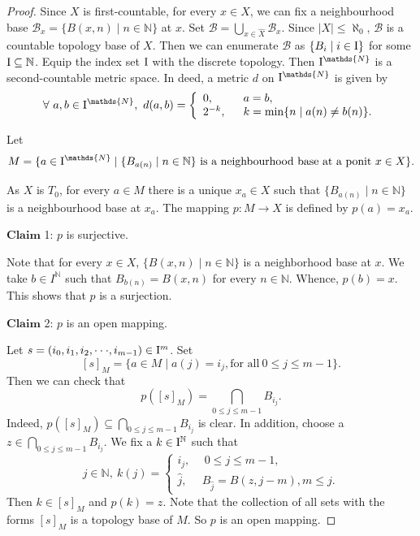 \documentclass[preprint,12pt]{elsarticle}
\numberwithin{equation}{section}
\begin{document}
\begin{proof} Since $X$ is first-countable, for every $x\in X$, we can fix a neighbourhood base $\mathcal{B}_{x}=\{B(x,n)\mid n\in\mathbb{N}\}$ at $x$. Set $\mathcal{B}=\bigcup\limits_{x\in \widehat{X}}\mathcal{B}_{x}$. Since $|X|\leq\aleph_{0}$, $\mathcal{B}$ is a countable topology base of $X$. Then we can enumerate $\mathcal{B}$ as $\{B_{i}\mid i\in {\rm I}\}$ for some ${\rm I}\subseteq\mathbb{N}$. Equip the index set ${\rm I}$ with the discrete topology. Then ${\rm I}^{\mathds{N}}$ is a second-countable metric space. In deed, a metric $d$ on ${\rm I}^{\mathds{N}}$ is given by
$$\forall \ a,b\in {\rm I}^{\mathds{N}}, \ d(a,b)=\left\{
             \begin{array}{ll}
              0, &\ \ a=b, \\
              2^{-k}, &\ \ k={\rm min}\{n\mid a(n)\neq b(n)\}.
             \end{array}
           \right.$$

Let $$M=\{a\in{\rm I}^{\mathds{N}}\mid \{B_{a(n)}\mid n\in\mathbb{N}\} \mbox{ is a neighbourhood base at a ponit}\ x\in X\}.$$

As $X$ is $T_{0}$, for every $a\in M$ there is a unique $x_{a}\in X$ such that $\{B_{a(n)}\mid n\in\mathbb{N}\}$ is a neighbourhood base at $x_{a}$. The mapping $p:M\longrightarrow X$ is defined by $p(a)=x_{a}$.

$\mathbf{Claim}$ 1: $p$ is surjective.

Note that for every $x\in X$, $\{B(x,n)\mid n\in\mathbb{N}\}$ is a neighborhood base at $x$. We take $b\in I^{\mathds{N}}$ such that $B_{b(n)}=B(x,n)$ for every $n\in\mathbb{N}$. Whence, $p(b)=x$. This shows that $p$ is a surjection.


$\mathbf{Claim}$ 2: $p$ is an open mapping.

Let $s=(i_{0},i_{1},i_{2},\cdot\cdot\cdot,i_{m-1})\in{\rm I}^{m}$. Set $$[s]_{M}=\{a\in M\mid a(j)=i_{j}, \mbox{for all}\ 0\leq j\leq m-1\}.$$ Then we can check that $$p([s]_{M})=\bigcap\limits_{0\leq j\leq m-1}B_{i_{j}}.$$  Indeed, $p([s]_{M})\subseteq\bigcap\limits_{0\leq j\leq m-1}B_{i_{j}}$ is clear. In addition, choose a $z\in\bigcap\limits_{0\leq j\leq m-1}B_{i_{j}}$. We fix a $k\in{\rm I}^{\mathbb{N}}$ such that $$j\in\mathds{N}, \ k(j)=\left\{
             \begin{array}{ll}
              i_{j}, &\ \ 0\leq j\leq m-1, \\
              \widehat{j}, &\ B_{\widehat{j}}=B(z,j-m),m\leq j.
             \end{array}
           \right.$$ Then $k\in[s]_{M}$ and $p(k)=z$. Note that the collection of all sets with the forms $[s]_{M}$ is a topology base of $M$. So $p$ is an open mapping.




\end{proof}
\end{document}
